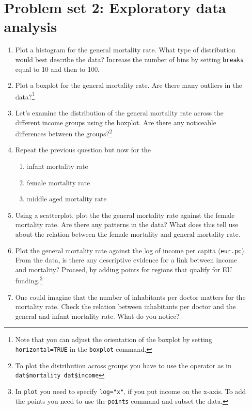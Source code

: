 \documentclass{tufte-handout}
\begin{document}
\section{Problem set 2: Exploratory data analysis}
\begin{enumerate}
  \item Plot a histogram for the general mortality rate. What type of distribution would best describe the data?
  Increase the number of bins by setting \texttt{breaks} equal to 10 and then to 100.

  \item Plot a boxplot for the general mortality rate. Are there many outliers in the data?\footnote{Note that you can adjust the orientation of the boxplot by setting \texttt{horizontal=TRUE} in the \texttt{boxplot} command.}

  \item Let's examine the distribution of the general mortality rate across the different income groups using the boxplot. 
  Are there any noticeable differences between the groups?\footnote{To plot the distribution across groups you have to use the \texttt{\texttildelow} operator as in \texttt{dat\$mortality \texttildelow dat\$income}}

  \item Repeat the previous question but now for the 
  \begin{enumerate}
    \item infant mortality rate
    \item female mortality rate
    \item middle aged mortality rate
  \end{enumerate}

  \item Using a scatterplot, plot the the general mortality rate against the female mortality rate. Are there any patterns in the data? What does this tell use about the relation between the female mortality and general mortality rate.

  \item Plot the general mortality rate against the log of income per capita (\texttt{eur.pc}). 
  From the data, is there any descriptive evidence for a link between income and mortality?
  Proceed, by adding points for regions that qualify for EU funding.\footnote{In \texttt{plot} you need to specify \texttt{log="x"}, if you put income on the x-axis. To add the points you need to use the \texttt{points} command and subset the data.} 

  \item One could imagine that the number of inhabitants per doctor matters for the mortality rate. 
  Check the relation between inhabitants per doctor and the general and infant mortality rate. 
  What do you notice?

\end{enumerate}
\end{document}
